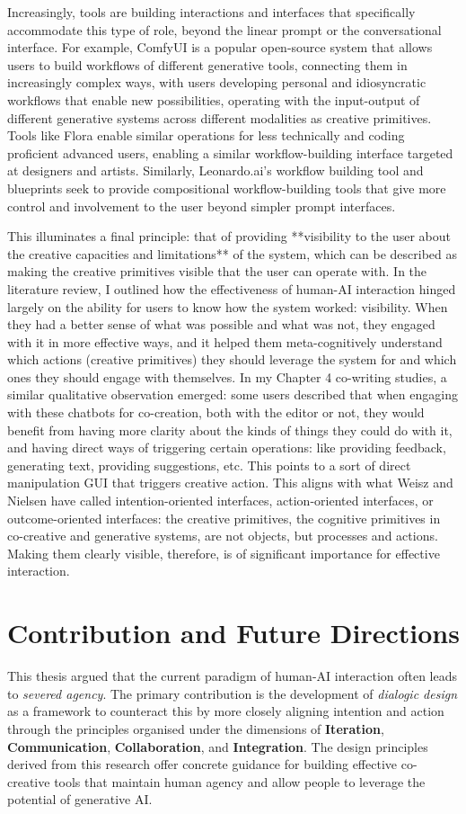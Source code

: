 Increasingly, tools are building interactions and interfaces that specifically accommodate this type of role, beyond the linear prompt or the conversational interface. For example, ComfyUI is a popular open-source system that allows users to build workflows of different generative tools, connecting them in increasingly complex ways, with users developing personal and idiosyncratic workflows that enable new possibilities, operating with the input-output of different generative systems across different modalities as creative primitives. Tools like Flora enable similar operations for less technically and coding proficient advanced users, enabling a similar workflow-building interface targeted at designers and artists. Similarly, Leonardo.ai's workflow building tool and blueprints seek to provide compositional workflow-building tools that give more control and involvement to the user beyond simpler prompt interfaces.

This illuminates a final principle: that of providing **visibility to the user about the creative capacities and limitations** of the system, which can be described as making the creative primitives visible that the user can operate with. In the literature review, I outlined how the effectiveness of human-AI interaction hinged largely on the ability for users to know how the system worked: visibility. When they had a better sense of what was possible and what was not, they engaged with it in more effective ways, and it helped them meta-cognitively understand which actions (creative primitives) they should leverage the system for and which ones they should engage with themselves. In my Chapter 4 co-writing studies, a similar qualitative observation emerged: some users described that when engaging with these chatbots for co-creation, both with the editor or not, they would benefit from having more clarity about the kinds of things they could do with it, and having direct ways of triggering certain operations: like providing feedback, generating text, providing suggestions, etc. This points to a sort of direct manipulation GUI that triggers creative action. This aligns with what Weisz and Nielsen have called intention-oriented interfaces, action-oriented interfaces, or outcome-oriented interfaces: the creative primitives, the cognitive primitives in co-creative and generative systems, are not objects, but processes and actions. Making them clearly visible, therefore, is of significant importance for effective interaction.


\section{Contribution and Future Directions}
This thesis argued that the current paradigm of human-AI interaction often leads to \textit{severed agency}. The primary contribution is the development of \textit{dialogic design} as a framework to counteract this by more closely aligning intention and action through the principles organised under the dimensions of \textbf{Iteration}, \textbf{Communication}, \textbf{Collaboration}, and \textbf{Integration}. The design principles derived from this research offer concrete guidance for building effective co-creative tools that maintain human agency and allow people to leverage the potential of generative AI.
